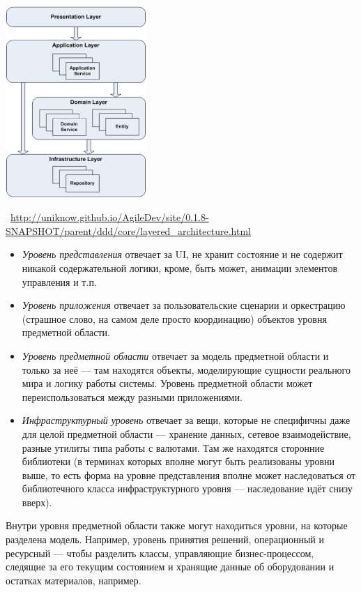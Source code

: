 \documentclass[a5paper]{article}
\newcommand{\attribution}[1] {
    \vspace{-4mm}\begin{flushright}\begin{scriptsize}\textcolor{gray}
    {\textcopyright\, #1}\end{scriptsize}\end{flushright}
}
\begin{document}
\begin{center}
    \includegraphics[width=0.4\textwidth]{dddLayers.png}
    \attribution{\url{http://uniknow.github.io/AgileDev/site/0.1.8-SNAPSHOT/parent/ddd/core/layered_architecture.html}}
\end{center}

\begin{itemize}
    \item \emph{Уровень представления} отвечает за UI, не хранит состояние и не содержит никакой содержательной логики, кроме, быть может, анимации элементов управления и т.п.
    \item \emph{Уровень приложения} отвечает за пользовательские сценарии и оркестрацию (страшное слово, на самом деле просто координацию) объектов уровня предметной области.
    \item \emph{Уровень предметной области} отвечает за модель предметной области и только за неё --- там находятся объекты, моделирующие сущности реального мира и логику работы системы. Уровень предметной области может переиспользоваться между разными приложениями.
    \item \emph{Инфраструктурный уровень} отвечает за вещи, которые не специфичны даже для целой предметной области --- хранение данных, сетевое взаимодействие, разные утилиты типа работы с валютами. Там же находятся сторонние библиотеки (в терминах которых вполне могут быть реализованы уровни выше, то есть форма на уровне представления вполне может наследоваться от библиотечного класса инфраструктурного уровня --- наследование идёт снизу вверх).
\end{itemize}

Внутри уровня предметной области также могут находиться уровни, на которые разделена модель. Например, уровень принятия решений, операционный и ресурсный --- чтобы разделить классы, управляющие бизнес-процессом, следящие за его текущим состоянием и хранящие данные об оборудовании и остатках материалов, например.
\end{document}
